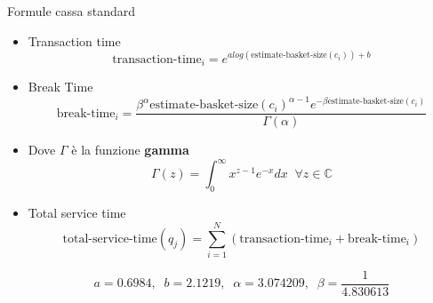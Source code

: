 \begin{frame}{Formule cassa standard}
	\begin{itemize}
		\item Transaction time
		\begin{equation}
			\text{transaction-time}_i = e^{a log(\text{estimate-basket-size}(c_i)) + b}
		\end{equation}
		\item Break Time
		\begin{equation}
			\text{break-time}_i = \frac{\beta^{\alpha} \text{estimate-basket-size}(c_i)^{\alpha - 1} e^{- \beta \text{estimate-basket-size}(c_i)}}{\Gamma (\alpha)}
		\end{equation}  
		
		\item Dove $\Gamma$ è la funzione \textbf{gamma}
		\begin{equation}
			\Gamma (z) = \int_{0}^{\infty} x^{z-1} e^{-x} dx \;\; \forall z \in \mathbb{C}
		\end{equation}
		
		\item Total service time
		\begin{equation}
			\text{total-service-time}(q_j) = \sum\limits_{i=1}^N \left( \text{transaction-time}_i + \text{break-time}_i \right)
		\end{equation}
		
		\begin{equation}
			a = 0.6984, \;\; b = 2.1219, \;\; \alpha = 3.074209, \;\; \beta = \frac{1}{4.830613}
		\end{equation}
		
	\end{itemize}  
\end{frame}

